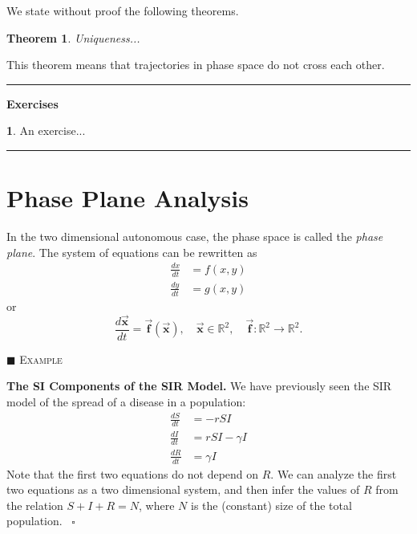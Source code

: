 \documentclass[reqno]{immbook}
\newcommand{\BF}{\vec{\textbf{f}}}
\newcommand{\BX}{\vec{\textbf{x}}}
\numberwithin{equation}{chapter}
\newtheorem{theorem}{Theorem}
\numberwithin{question}{section}
\numberwithin{theorem}{chapter}
\numberwithin{figure}{chapter}
\theoremstyle{definition}
\newtheorem{exercise}{}[section]
\newenvironment{xexample}%
{%

\medskip\noindent\addtocounter{example}{1}$\blacksquare$ \textsc{Example \theexample}\hspace*{1em}%
}%
{%
~\hfill$\square$

\medskip
}
\newenvironment{exercises}%
{%
\medskip\hrule\medskip\noindent\textbf{Exercises}%
}%
{%
\medskip\hrule
}
\begin{document}
We state without proof the following theorems.
\begin{theorem}
Uniqueness...
\end{theorem}
This theorem means that trajectories in phase
space do not cross each other.

\begin{exercises}
\begin{exercise}
An exercise...
\end{exercise}
\end{exercises}
%
\newpage
%
\section{Phase Plane Analysis}

In the two dimensional autonomous case, the phase space
is called the \emph{phase plane}.
The system of equations can be rewritten as
\begin{equation}
\begin{split}
    \frac{dx}{dt} & = f(x,y) \\
    \frac{dy}{dt} & = g(x,y)
\end{split}
\end{equation}
or
\begin{equation}
  \frac{d\BX}{dt} = \BF(\BX), \quad \BX \in \mathbb{R}^2, \quad
      \BF : \mathbb{R}^2 \rightarrow \mathbb{R}^2.
\end{equation}
\begin{xexample}
\textbf{The SI Components of the SIR Model.}
We have previously seen the SIR model of the spread of
a disease in a population:
\begin{equation}
\begin{split}
   \frac{dS}{dt} & = -rSI \\
   \frac{dI}{dt} & = rSI -\gamma I \\
   \frac{dR}{dt} & = \gamma I
\end{split}
\end{equation}
Note that the first two equations do not depend on $R$.
We can analyze the first two equations as a two dimensional
system, and then infer the values of $R$ from the
relation $S+I+R=N$, where $N$ is the (constant) size
of the total population.
\end{xexample}


%
\end{document}
